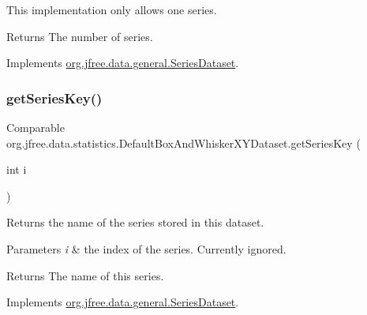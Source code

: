This implementation only allows one series.

\begin{DoxyReturn}{Returns}
The number of series. 
\end{DoxyReturn}


Implements \mbox{\hyperlink{interfaceorg_1_1jfree_1_1data_1_1general_1_1_series_dataset_a84fe822f5918f941d9de1ed1b73c9f58}{org.\+jfree.\+data.\+general.\+Series\+Dataset}}.

\mbox{\label{classorg_1_1jfree_1_1data_1_1statistics_1_1_default_box_and_whisker_x_y_dataset_a2b2ce173b44011ab95a798047f997432}} 
\subsubsection{\texorpdfstring{get\+Series\+Key()}{getSeriesKey()}}
{\footnotesize\ttfamily Comparable org.\+jfree.\+data.\+statistics.\+Default\+Box\+And\+Whisker\+X\+Y\+Dataset.\+get\+Series\+Key (\begin{DoxyParamCaption}\item[{int}]{i }\end{DoxyParamCaption})}

Returns the name of the series stored in this dataset.


\begin{DoxyParams}{Parameters}
{\em i} & the index of the series. Currently ignored.\\
\hline
\end{DoxyParams}
\begin{DoxyReturn}{Returns}
The name of this series. 
\end{DoxyReturn}


Implements \mbox{\hyperlink{interfaceorg_1_1jfree_1_1data_1_1general_1_1_series_dataset_a60488892b2314a05a012999e26a74178}{org.\+jfree.\+data.\+general.\+Series\+Dataset}}.

\mbox{\label{classorg_1_1jfree_1_1data_1_1statistics_1_1_default_box_and_whisker_x_y_dataset_a2883ae1f7436e49fba834c2e14f039a7}} 
